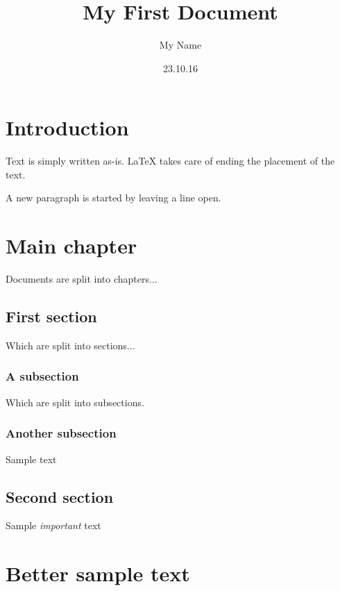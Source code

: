 \documentclass[a4paper]{report}
\title{My First Document}
\author{My Name}
\date{23.10.16}
\begin{document}
\maketitle
\tableofcontents

\chapter{Introduction}
Text is simply written as-is.
\LaTeX{} takes care of ending the placement of the text.

A new paragraph is started by leaving a line open.

\chapter{Main chapter}
Documents are split into chapters...

\section{First section}
Which are split into sections...

\subsection{A subsection}
Which are split into subsections.

\subsection{Another subsection}
Sample text

\section{Second section}
Sample \emph{important} text

\chapter{Better sample text}
\lipsum
\end{document}
